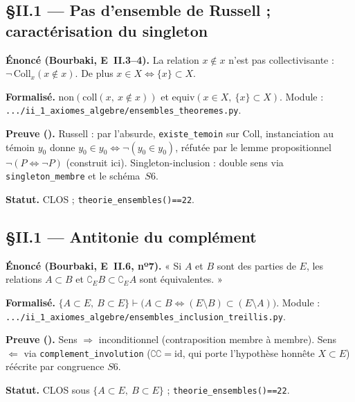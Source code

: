 
\subsection{§II.1 --- Pas d'ensemble de Russell ; caractérisation du singleton}
\textbf{Énoncé (Bourbaki, E~II.3--4).} La relation $x\notin x$ n'est pas
collectivisante : $\neg\,\mathrm{Coll}_x(x\notin x)$. De plus
$x\in X \Leftrightarrow \{x\}\subset X$.

\textbf{Formalisé.} $\mathrm{non}(\mathrm{coll}(x,\ x\notin x))$ et
$\mathrm{equiv}(x\in X,\ \{x\}\subset X)$.
Module : \texttt{.../ii\_1\_axiomes\_algebre/ensembles\_theoremes.py}.

\textbf{Preuve (\Nstar).} Russell : par l'absurde, \texttt{existe\_temoin} sur
$\mathrm{Coll}$, instanciation au témoin $y_0$ donne $y_0\in y_0\Leftrightarrow\neg(y_0\in y_0)$,
réfutée par le lemme propositionnel $\neg(P\Leftrightarrow\neg P)$ (construit ici).
Singleton-inclusion : double sens via \texttt{singleton\_membre} et le schéma~$S6$.

\textbf{Statut.} CLOS ; \texttt{theorie\_ensembles()==22}.

\subsection{§II.1 --- Antitonie du complément}
\textbf{Énoncé (Bourbaki, E~II.6, nº7).} « Si $A$ et $B$ sont des parties de $E$, les
relations $A\subset B$ et $\complement_E B\subset\complement_E A$ sont équivalentes. »

\textbf{Formalisé.} $\{A\subset E,\ B\subset E\}\vdash\bigl(A\subset B \Leftrightarrow
(E\setminus B)\subset(E\setminus A)\bigr)$. Module :
\texttt{.../ii\_1\_axiomes\_algebre/ensembles\_inclusion\_treillis.py}.

\textbf{Preuve (\Nstar).} Sens $\Rightarrow$ inconditionnel (contraposition membre à
membre). Sens $\Leftarrow$ via \texttt{complement\_involution} ($\complement\complement=\mathrm{id}$,
qui porte l'hypothèse honnête $X\subset E$) réécrite par congruence $S6$.

\textbf{Statut.} CLOS sous $\{A\subset E,\ B\subset E\}$ ; \texttt{theorie\_ensembles()==22}.

